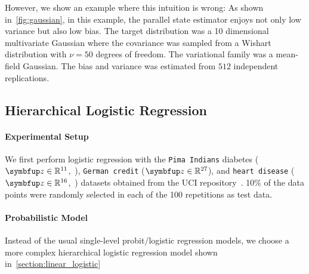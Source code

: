 However, we show an example where this intuition is wrong: As shown in~\cref{fig:gaussian}, in this example, the parallel state estimator enjoys not only low variance but also low bias.
The target distribution was a 10 dimensional multivariate Gaussian where the covariance was sampled from a Wishart distribution with \(\nu = 50\) degrees of freedom.
The variational family was a mean-field Gaussian.
The bias and variance was estimated from \(512\) independent replications.

\subsection{Hierarchical Logistic Regression}\label{section:logistic}
\vspace{-0.05in}
\paragraph{Experimental Setup}
We first perform logistic regression with the \texttt{Pima Indians} diabetes (\(\vz \in \mathbb{R}^{11}\),~\citealt{smith_using_1988}), \texttt{German credit} (\(\vz \in \mathbb{R}^{27}\)), and \texttt{heart disease} (\(\vz \in \mathbb{R}^{16}\),~\citealt{detrano_international_1989}) datasets obtained from the UCI repository~\citep{Dua:2019}.
10\% of the data points were randomly selected in each of the 100 repetitions as test data.


%

\vspace{-0.1in}
\paragraph{Probabilistic Model}
Instead of the usual single-level probit/logistic regression models, we choose a more complex hierarchical logistic regression model shown in~\cref{section:linear_logistic}

